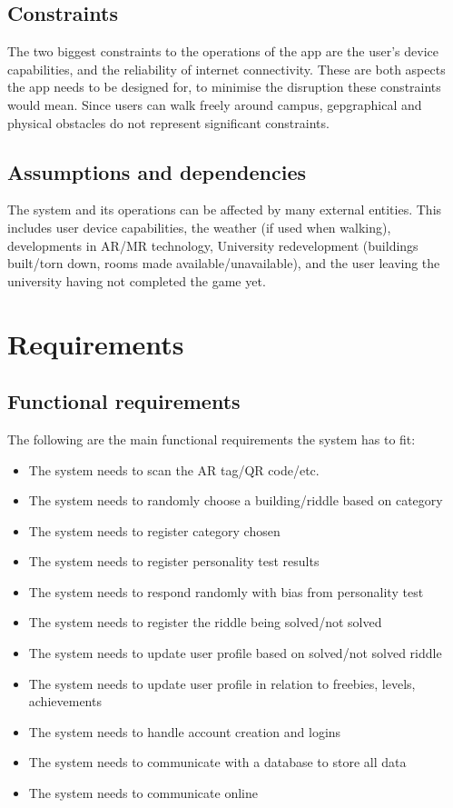 \documentclass[10pt,twocolumn]{article} %
\begin{document}
\subsection*{Constraints}
The two biggest constraints to the operations of the app are the user's device capabilities, and the reliability of internet connectivity. These are both aspects the app needs to be designed for, to minimise the disruption these constraints would mean. Since users can walk freely around campus, gepgraphical and physical obstacles do not represent significant constraints.

\subsection*{Assumptions and dependencies}
The system and its operations can be affected by many external entities. This includes user device capabilities, the weather (if used when walking), developments in AR/MR technology, University redevelopment (buildings built/torn down, rooms made available/unavailable), and the user leaving the university having not completed the game yet.

\section*{Requirements}

\subsection*{Functional requirements}
The following are the main functional requirements the system has to fit:
\begin{itemize}[noitemsep]
  \item The system needs to scan the AR tag/QR code/etc.
  \item The system needs to randomly choose a building/riddle based on category
  \item The system needs to register category chosen
  \item The system needs to register personality test results
  \item The system needs to respond randomly with bias from personality test
  \item The system needs to register the riddle being solved/not solved
  \item The system needs to update user profile based on solved/not solved riddle
  \item The system needs to update user profile in relation to freebies, levels, achievements
  \item The system needs to handle account creation and logins
  \item The system needs to communicate with a database to store all data
  \item The system needs to communicate online
\end{itemize}
\end{document}
